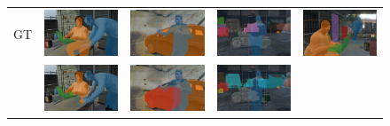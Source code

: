 
\begin{figure}[t]
    \centering
    \setlength{\tabcolsep}{1pt}
    \renewcommand{\arraystretch}{4.3}
    \begin{tabular}{ccccc}
    GT & 
    \includegraphics[align=c,width=0.23\linewidth]{fig/sailvos_results/21781_gt} &
    \includegraphics[align=c,width=0.23\linewidth]{fig/sailvos_results/10561_gt} &
    \includegraphics[align=c,width=0.23\linewidth]{fig/sailvos_results/14498_gt} &
    \includegraphics[align=c,width=0.23\linewidth]{fig/sailvos_results/22243_gt}
    \\
    \cite{hu2019sail} & 
    \includegraphics[align=c,width=0.23\linewidth]{fig/sailvos_results/21781_base} &
    \includegraphics[align=c,width=0.23\linewidth]{fig/sailvos_results/10561_base} &
    \includegraphics[align=c,width=0.23\linewidth]{fig/sailvos_results/14498_base} &

\end{tabular}
\end{figure}
